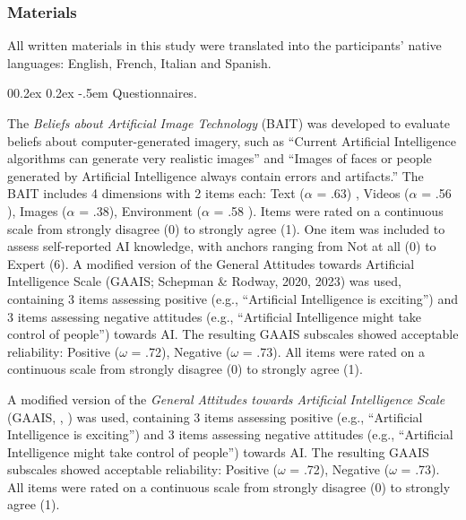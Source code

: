 \documentclass[
  jou,
  floatsintext,
  longtable,
  nolmodern,
  notxfonts,
  notimes,
  colorlinks=true,linkcolor=blue,citecolor=blue,urlcolor=blue]{apa7}
\makeatletter
\renewcommand{\paragraph}{\@startsection{paragraph}{4}{\parindent}%
	{0\baselineskip \@plus 0.2ex \@minus 0.2ex}%
	{-.5em}%
	{\normalfont\normalsize\bfseries\typesectitle}}
\makeatother
\begin{document}
\subsubsection{Materials}\label{materials}

All written materials in this study were translated into the
participants' native languages: English, French, Italian and Spanish.

\paragraph{Questionnaires.}\label{questionnaires}

The \emph{Beliefs about Artificial Image Technology} (BAIT) was
developed to evaluate beliefs about computer-generated imagery, such as
``Current Artificial Intelligence algorithms can generate very realistic
images'' and ``Images of faces or people generated by Artificial
Intelligence always contain errors and artifacts.'' The BAIT includes 4
dimensions with 2 items each: Text (\(\alpha\) = .63) , Videos
(\(\alpha\) = .56 ), Images (\(\alpha\) = .38), Environment (\(\alpha\)
= .58 ). Items were rated on a continuous scale from strongly disagree
(0) to strongly agree (1). One item was included to assess self-reported
AI knowledge, with anchors ranging from Not at all (0) to Expert (6). A
modified version of the General Attitudes towards Artificial
Intelligence Scale (GAAIS; Schepman \& Rodway, 2020, 2023) was used,
containing 3 items assessing positive (e.g., ``Artificial Intelligence
is exciting'') and 3 items assessing negative attitudes (e.g.,
``Artificial Intelligence might take control of people'') towards AI.
The resulting GAAIS subscales showed acceptable reliability: Positive
(\(\omega\) = .72), Negative (\(\omega\) = .73). All items were rated on
a continuous scale from strongly disagree (0) to strongly agree (1).

A modified version of the \emph{General Attitudes towards Artificial
Intelligence Scale} (GAAIS, , ) was used,
containing 3 items assessing positive (e.g., ``Artificial Intelligence
is exciting'') and 3 items assessing negative attitudes (e.g.,
``Artificial Intelligence might take control of people'') towards AI.
The resulting GAAIS subscales showed acceptable reliability: Positive
(\(\omega\) = .72), Negative (\(\omega\) = .73). All items were rated on
a continuous scale from strongly disagree (0) to strongly agree (1).
\end{document}
